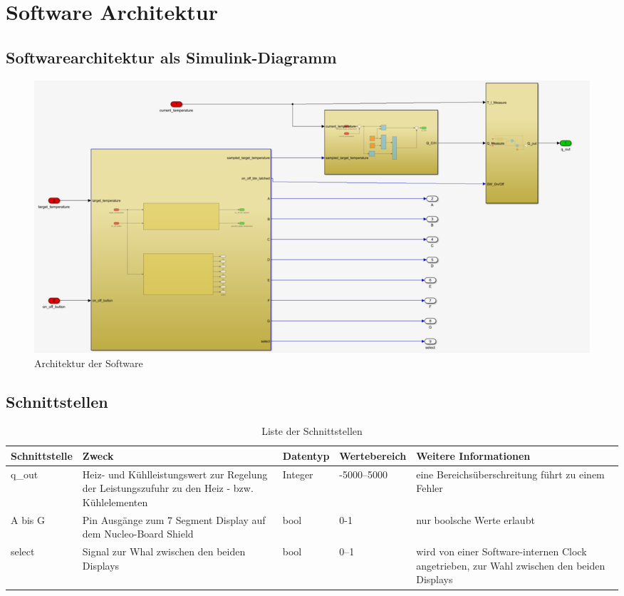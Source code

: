 \documentclass[a4paper,12pt]{article}
\begin{document}
	\section{Software Architektur}
	\subsection{Softwarearchitektur als Simulink-Diagramm}
	\begin{figure}[h!]
		\centering
		\includegraphics[width=\textwidth]{sw_architektur.png}
		\caption{Architektur der Software}
	\end{figure}
	\subsection{Schnittstellen}
	\begin{table}[h!]
		\centering
		\renewcommand{\arraystretch}{1.5} %
		\begin{tabular}{@{} p{3cm} p{4cm} p{3cm} p{3cm} p{4cm} @{}}
			\toprule
			\textbf{Schnittstelle} & \textbf{Zweck} & \textbf{Datentyp} & \textbf{Wertebereich} & \textbf{Weitere Informationen} \\
			\midrule
			q\_out & Heiz- und Kühlleistungswert zur Regelung der Leistungszufuhr zu den Heiz - bzw. Kühlelementen & Integer & -5000–5000 & eine Bereichsüberschreitung führt zu einem Fehler \\
			A bis G & Pin Ausgänge zum 7 Segment Display auf dem Nucleo-Board Shield & bool & 0-1 & nur boolsche Werte erlaubt \\
			select & Signal zur Whal zwischen den beiden Displays & bool & 0–1 & wird von einer Software-internen Clock angetrieben, zur Wahl zwischen den beiden Displays \\
			\bottomrule
		\end{tabular}
		\caption{Liste der Schnittstellen}
		\label{tab:schnittstellen}
	\end{table}
	
\end{document}
